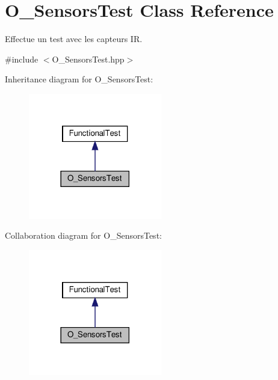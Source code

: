 \hypertarget{classO__SensorsTest}{}\section{O\+\_\+\+Sensors\+Test Class Reference}
\label{classO__SensorsTest}


Effectue un test avec les capteurs IR.  




{\ttfamily \#include $<$O\+\_\+\+Sensors\+Test.\+hpp$>$}



Inheritance diagram for O\+\_\+\+Sensors\+Test\+:
\nopagebreak
\begin{figure}[H]
\begin{center}
\leavevmode
\includegraphics[width=165pt]{classO__SensorsTest__inherit__graph}
\end{center}
\end{figure}


Collaboration diagram for O\+\_\+\+Sensors\+Test\+:
\nopagebreak
\begin{figure}[H]
\begin{center}
\leavevmode
\includegraphics[width=165pt]{classO__SensorsTest__coll__graph}
\end{center}
\end{figure}

